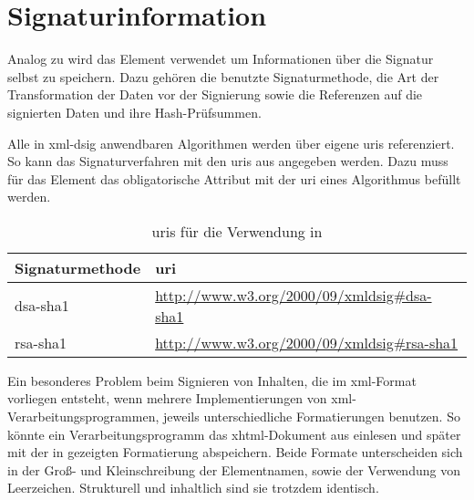 \section{Signaturinformation}
Analog zu  wird das Element  verwendet um Informationen über die Signatur selbst zu speichern. Dazu gehören die benutzte
Signaturmethode, die Art der Transformation der Daten vor der Signierung sowie die Referenzen auf die signierten Daten und ihre Hash-Prüfsummen.

Alle in \gls{xml-dsig} anwendbaren Algorithmen werden über eigene \glspl{uri} referenziert. So kann das Signaturverfahren mit den \glspl{uri} aus
 angegeben werden. Dazu muss für das Element  das obligatorische Attribut
 mit der \gls{uri} eines Algorithmus befüllt werden.

\begin{table}
    \centering
    \begin{tabularx}{\textwidth}{ l X }
        Signaturmethode & \gls{uri} \\
        \hline
        \hline
        \gls{dsa}-\gls{sha1} & \url{http://www.w3.org/2000/09/xmldsig\#dsa-sha1} \\
        \hline
        \gls{rsa}-\gls{sha1} & \url{http://www.w3.org/2000/09/xmldsig\#rsa-sha1} \\
        \hline
    \end{tabularx}
    \caption{\protect\glspl{uri} für die Verwendung in }
    \label{tab:xml-dsig-signature-method-uri}
\end{table}





Ein besonderes Problem beim Signieren von Inhalten, die im \gls{xml}-Format vorliegen entsteht, wenn mehrere Implementierungen von
\gls{xml}-Verarbeitungsprogrammen, jeweils unterschiedliche Formatierungen benutzen. So könnte ein Verarbeitungsprogramm das \gls{xhtml}-Dokument aus
 einlesen und später mit der in  gezeigten Formatierung abspeichern. Beide Formate unterscheiden sich
in der Groß- und Kleinschreibung der Elementnamen, sowie der Verwendung von Leerzeichen. Strukturell und inhaltlich sind sie trotzdem identisch.

